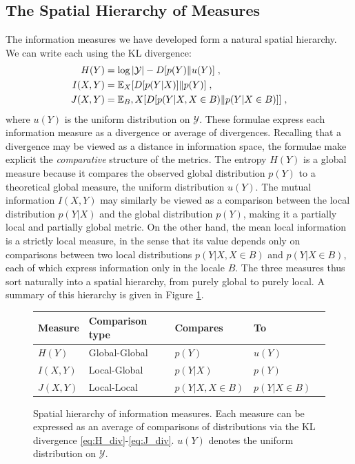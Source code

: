 \documentclass[english]{scrartcl}
\begin{document}
	\subsection{The Spatial Hierarchy of Measures}
		The information measures we have developed form a natural spatial hierarchy. We can write each using the KL divergence:
		\begin{align}
			H(Y) &= \log \mathcal{\left|Y\right|} - D[p(Y) \| u(Y)] \;, \label{eq:H_div} \\ 
			I(X,Y) &= \mathbb{E}_X[D[p(Y|X)]\| p(Y)] \;, \label{eq:I_div} \\ 
			J(X,Y) &= \mathbb{E}_B,X[D[p(Y|X, X\in B) \| p(Y|X \in B)]] \;, \label{eq:J_div}
		\end{align}
		where $u(Y)$ is the uniform distribution on $\mathcal{Y}$. These formulae express each information measure as a divergence or average of divergences. Recalling that a divergence may be viewed as a distance in information space, the formulae make explicit the \emph{comparative} structure of the metrics. The entropy $H(Y)$ is a global measure because it compares the observed global distribution $p(Y)$ to a theoretical global measure, the uniform distribution $u(Y)$. The mutual information $I(X,Y)$ may similarly be viewed as a comparison between the local distribution $p(Y|X)$ and the global distribution $p(Y)$, making it a partially local and partially global metric. On the other hand, the mean local information is a strictly local measure, in the sense that its value depends only on comparisons between two local distributions $p(Y|X,X\in B)$ and $p(Y|X \in B)$, each of which express information only in the locale $B$. The three measures thus sort naturally into a spatial hierarchy, from purely global to purely local. A summary of this hierarchy is given in Figure \ref{fig:hierarchy}. 

		\begin{figure}
			\centering
			\begin{tabular}{l l l l l }
				\textbf{Measure} & \textbf{Comparison type} & \textbf{Compares} & \textbf{To} \\
				\hline 
				 $H(Y)$ & Global-Global & $p(Y)$ & $u(Y)$ \\
				 $I(X,Y)$ & Local-Global & $p(Y|X)$ & $p(Y)$ \\
				 $J(X,Y)$ & Local-Local & $p(Y|X, X \in B)$ & $p(Y|X \in B)$ 
			\end{tabular}
			\caption{Spatial hierarchy of information measures. Each measure can be expressed as an average of comparisons of distributions via the KL divergence \eqref{eq:H_div}-\eqref{eq:J_div}. $u(Y)$ denotes the uniform distribution on $\mathcal{Y}$.} \label{fig:hierarchy}
		\end{figure}
\end{document}
